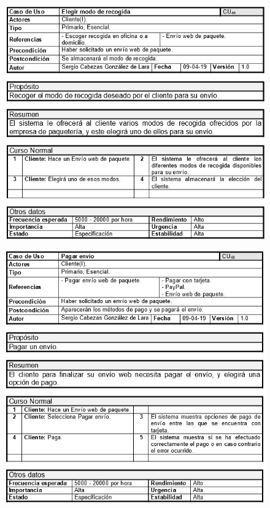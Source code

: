 \begin{figure}[H]
	\centering
	\includegraphics[width=16cm]{55}
\end{figure}
\begin{figure}[H]
	\centering
	\includegraphics[width=16cm]{56}
\end{figure}
